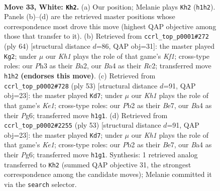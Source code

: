 \documentclass[11pt]{article}
\begin{document}
\clearpage

\begin{figure}[p]\centering
\begin{subfigure}{0.46\textwidth}\centering
\resizebox{\linewidth}{!}{%
\newchessgame
\chessboard[
  setfen={r1b5/ppp2ppk/7p/3qb3/BQ6/5PnP/PP4P1/R1B4K w - - 6 33},
  showmover=false,
  pgfstyle=straightmove, color=movearrow, markmove={h1-h2}
]}
\caption{}
\end{subfigure}\hfill
\begin{subfigure}{0.46\textwidth}\centering
\resizebox{\linewidth}{!}{%
\newchessgame
\chessboard[
  setfen={3r4/pp4k1/q6p/P2p1p2/1Q1bp3/6P1/BPR2P1P/5K2 w - - 2 33},
  showmover=false,
  pgfstyle=straightmove, color=movearrow, markmove={f1-g2}
]}
\caption{}
\end{subfigure}
\\[4pt]
\begin{subfigure}{0.46\textwidth}\centering
\resizebox{\linewidth}{!}{%
\newchessgame
\chessboard[
  setfen={4k2r/2q1b2p/p4ppB/np1B1b2/3Q4/7P/P1P2PP1/4R1K1 b k - 2 27},
  showmover=false,
  pgfstyle=straightmove, color=movearrow, markmove={e8-d7}
]}
\caption{}
\end{subfigure}\hfill
\begin{subfigure}{0.46\textwidth}\centering
\resizebox{\linewidth}{!}{%
\newchessgame
\chessboard[
  setfen={4k2r/2q1b2p/p4ppB/np1B1b2/3Q4/7P/P1P2PP1/4R1K1 b k - 2 27},
  showmover=false,
  pgfstyle=straightmove, color=movearrow, markmove={e8-d7}
]}
\caption{}
\end{subfigure}
\caption{\textbf{Move 33, White: \texttt{Kh2}.} (a) Our position; Melanie plays \texttt{Kh2} (\texttt{h1h2}). Panels (b)--(d) are the retrieved master positions whose correspondence most drove this move (highest QAP objective among those that transfer to it). (b) Retrieved from \texttt{ccrl\_top\_p0001\#272} (ply 64) [structural distance $d$=86, QAP obj=31]: the master played \texttt{Kg2}; under $\mu$ our \emph{Kh1} plays the role of that game's \emph{Kf1}; cross-type roles: our \emph{P}h3 as their \emph{B}a2, our \emph{B}a4 as their \emph{R}c2; transferred move \texttt{h1h2} \textbf{(endorses this move)}. (c) Retrieved from \texttt{ccrl\_top\_p0002\#728} (ply 53) [structural distance $d$=91, QAP obj=23]: the master played \texttt{Kd7}; under $\mu$ our \emph{Kh1} plays the role of that game's \emph{Ke1}; cross-type roles: our \emph{P}b2 as their \emph{B}e7, our \emph{B}a4 as their \emph{P}g6; transferred move \texttt{h1g1}. (d) Retrieved from \texttt{ccrl\_top\_p0002\#2255} (ply 53) [structural distance $d$=91, QAP obj=23]: the master played \texttt{Kd7}; under $\mu$ our \emph{Kh1} plays the role of that game's \emph{Ke1}; cross-type roles: our \emph{P}b2 as their \emph{B}e7, our \emph{B}a4 as their \emph{P}g6; transferred move \texttt{h1g1}. Synthesis: 1 retrieved analog transferred to \texttt{Kh2} (summed QAP objective 31, the strongest correspondence among the candidate moves); Melanie committed it via the \texttt{search} selector.}
\label{fig:thought-m64}
\end{figure}
\end{document}
